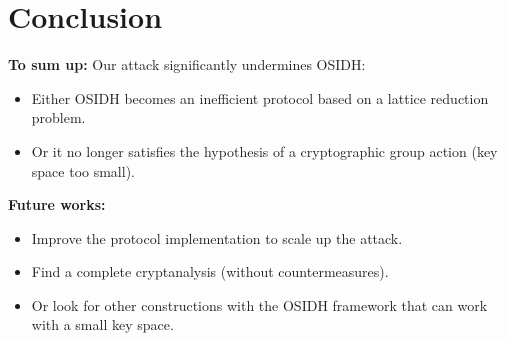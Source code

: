 \documentclass[10pt]{beamer}
\theoremstyle{plain}
\theoremstyle{definition}
\renewcommand{\(}{\left(}
\renewcommand{\)}{\right)}
\begin{document}
\section{Conclusion}

\begin{frame}
\textbf{To sum up:} Our attack significantly undermines OSIDH:

\vspace{0.3cm}

\begin{itemize}
\item Either OSIDH becomes an inefficient protocol based on a lattice reduction problem.

\item Or it no longer satisfies the hypothesis of a cryptographic group action (key space too small).

\end{itemize}

\vspace{0.5cm}
\pause 

\textbf{Future works:}

\vspace{0.3cm}

\begin{itemize}
\item Improve the protocol implementation to scale up the attack.

\item Find a complete cryptanalysis (without countermeasures).

\item Or look for other constructions with the OSIDH framework that can work with a small key space. 
\end{itemize}
\end{frame}
\end{document}
